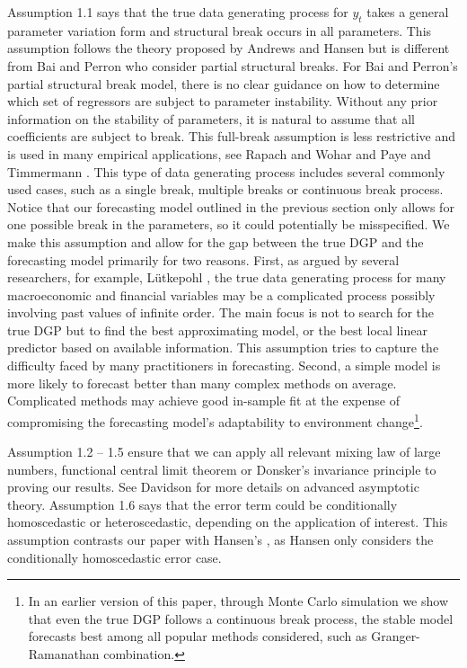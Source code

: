 Assumption 1.1 says that the true data generating process for $y_t$ takes a general parameter variation form and structural break occurs in all parameters. This assumption follows the theory proposed by Andrews and Hansen but is different from Bai and Perron who consider partial structural breaks. For Bai and Perron's \cite{bai_perron98} partial structural break model, there is no clear guidance on how to determine which set of regressors are subject to parameter instability. Without any prior information on the stability of parameters, it is natural to assume that all coefficients are subject to break. This full-break assumption is less restrictive and is used in many empirical applications, see Rapach and Wohar \cite{rapach_wohar_JFE2006} and Paye and Timmermann \cite{paye_timmermann_JEF2006}. This type of data generating process includes several commonly used cases, such as a single break, multiple breaks or continuous break process. Notice that our forecasting model outlined in the previous section only allows for one possible break in the parameters, so it could potentially be misspecified. We make this assumption and allow for the gap between the true DGP and the forecasting model primarily for two reasons. First, as argued by several researchers, for example, L\"{u}tkepohl \cite{lutkepohl_textbook}, the true data generating process for many macroeconomic and financial variables may be a complicated process possibly involving past values of infinite order. The main focus is not to search for the true DGP but to find the best approximating model, or the best local linear predictor based on available information. This assumption tries to capture the difficulty faced by many practitioners in forecasting. Second, a simple model is more likely to forecast better than many complex methods on average. Complicated methods may achieve good in-sample fit at the expense of compromising the forecasting model's adaptability to environment change\footnote{In an earlier version of this paper, through Monte Carlo simulation we show that even the true DGP follows a continuous break process, the stable model forecasts best among all popular methods considered, such as Granger-Ramanathan combination.}.

Assumption 1.2 -- 1.5 ensure that we can apply all relevant mixing law of large numbers, functional central limit theorem or Donsker's invariance principle to proving our results. See Davidson \cite{davidson_textbook} for more details on advanced asymptotic theory. Assumption 1.6 says that the error term could be conditionally homoscedastic or heteroscedastic, depending on the application of interest. This assumption contrasts our paper with Hansen's \cite{hansen2009averaging}, as Hansen only considers the conditionally homoscedastic error case.

